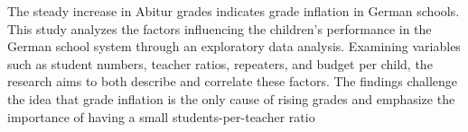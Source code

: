 

The steady increase in Abitur grades indicates grade inflation in German schools. This study analyzes the factors influencing the children's performance in the German school system through an exploratory data analysis. Examining variables such as student numbers, teacher ratios, repeaters, and budget per child, the research aims to both describe and correlate these factors. The findings challenge the idea that grade inflation is the only cause of rising grades and emphasize the importance of having a small students-per-teacher ratio